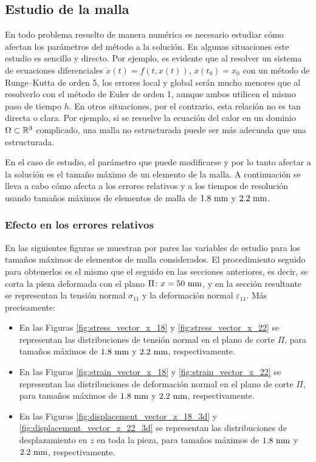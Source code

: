\subsection{Estudio de la malla}

En todo problema resuelto de manera numérica es necesario estudiar cómo afectan los parámetros del método a la solución. En algunas situaciones este estudio es sencillo y directo. Por ejemplo, es evidente que al resolver un sistema de ecuaciones diferenciales $\dot{x}(t) = f(t,x(t))$, $x(t_0) = x_0$ con un método de Runge--Kutta de orden 5, los errores local y global serán mucho menores que al resolverlo con el método de Euler de orden 1, aunque ambos utilicen el mismo paso de tiempo $h$. En otros situaciones, por el contrario, esta relación no es tan directa o clara. Por ejemplo, si se resuelve la ecuación del calor en un dominio $\Omega \subset \real^3$ complicado, una malla no estructurada puede ser más adecuada que una estructurada. 

En el caso de estudio, el parámetro que puede modificarse y por lo tanto afectar a la solución es el tamaño máximo de un elemento de la malla. A continuación se lleva a cabo cómo afecta a los errores relativos y a los tiempos de resolución usando tamaños máximos de elementos de malla de $1.8 \ \milli\meter$ y $2.2 \ \milli\meter$.

\subsubsection{Efecto en los errores relativos}

En las siguientes figuras se muestran por pares las variables de estudio para los tamaños máximos de elementos de malla considerados. El procedimiento seguido para obtenerlos es el mismo que el seguido en las secciones anteriores, es decir, se corta la pieza deformada con el plano $\Pi \colon x = 50 \ \milli\meter$, y en la sección resultante se representan la tensión normal $\sigma_{11}$ y la deformación normal $\varepsilon_{11}$. Más precisamente:
\begin{itemize}
    \item En las Figuras \ref{fig:stress_vector_x_18} y \ref{fig:stress_vector_x_22} se representan las distribuciones de tensión normal en el plano de corte $\Pi$, para tamaños máximos de $1.8 \ \milli\meter$ y $2.2 \ \milli\meter$, respectivamente.
    \item En las Figuras \ref{fig:strain_vector_x_18} y \ref{fig:strain_vector_x_22} se representan las distribuciones de deformación normal en el plano de corte $\Pi$, para tamaños máximos de $1.8 \ \milli\meter$ y $2.2 \ \milli\meter$, respectivamente.
    \item En las Figuras \ref{fig:displacement_vector_z_18_3d} y \ref{fig:displacement_vector_z_22_3d} se representan las distribuciones de desplazamiento en $z$ en toda la pieza, para tamaños máximos de $1.8 \ \milli\meter$ y $2.2 \ \milli\meter$, respectivamente.
\end{itemize}


